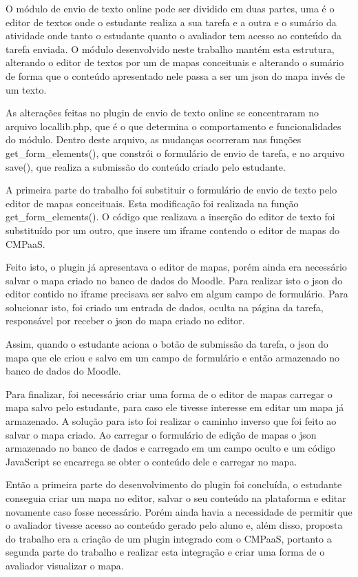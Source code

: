 \documentclass[
	12pt,				%
	openright,			%
	oneside,			%
	a4paper,			%
	english,			%
	french,				%
	spanish,			%
	brazil				%
	]{abntex2}
\begin{document}
O módulo de envio de texto online pode ser dividido em duas partes, uma é o editor de textos onde o estudante realiza a sua tarefa e a outra e o sumário da atividade onde tanto o estudante quanto o avaliador tem acesso ao conteúdo da tarefa enviada. O módulo desenvolvido neste trabalho mantém esta estrutura, alterando o editor de textos por um de mapas conceituais e alterando o sumário de forma que o conteúdo apresentado nele passa a ser um json do mapa invés de um texto.

As alterações feitas no plugin de envio de texto online se concentraram no arquivo locallib.php, que é o que determina o comportamento e funcionalidades do módulo. Dentro deste arquivo, as mudanças ocorreram nas funções get\_form\_elements(), que constrói o formulário de envio de tarefa, e no arquivo save(), que realiza a submissão do conteúdo criado pelo estudante.

A primeira parte do trabalho foi substituir o formulário de envio de texto pelo editor de mapas conceituais. Esta modificação foi realizada na função get\_form\_elements(). O código que realizava a inserção do editor de texto foi substituído por um outro, que insere um iframe contendo o editor de mapas do CMPaaS. 

Feito isto, o plugin já apresentava o editor de mapas, porém ainda era necessário salvar o mapa criado no banco de dados do Moodle. Para realizar isto o json do editor contido no iframe precisava ser salvo em algum campo de formulário. Para solucionar isto, foi criado um entrada de dados, oculta na página da tarefa, responsável por receber o json do mapa criado no editor.

Assim, quando o estudante aciona o botão de submissão da tarefa, o json do mapa que ele criou e salvo em um campo de formulário e então armazenado no banco de dados do Moodle.

Para finalizar, foi necessário criar uma forma de o editor de mapas carregar o mapa salvo pelo estudante, para caso ele tivesse interesse em editar um mapa já armazenado. A solução para isto foi realizar o caminho inverso que foi feito ao salvar o mapa criado. Ao carregar o formulário de edição de mapas o json armazenado no banco de dados e carregado em um campo oculto e um código JavaScript se encarrega se obter o conteúdo dele e carregar no mapa.

Então a primeira parte do desenvolvimento do plugin foi concluída, o estudante conseguia criar um mapa no editor, salvar o seu conteúdo na plataforma e editar novamente caso fosse necessário. Porém ainda havia a necessidade de permitir que o avaliador tivesse acesso ao conteúdo gerado pelo aluno e, além disso, proposta do trabalho era a criação de um plugin integrado com o CMPaaS,  portanto a segunda parte do trabalho e realizar esta integração e criar uma forma de o avaliador visualizar o mapa.
\end{document}
